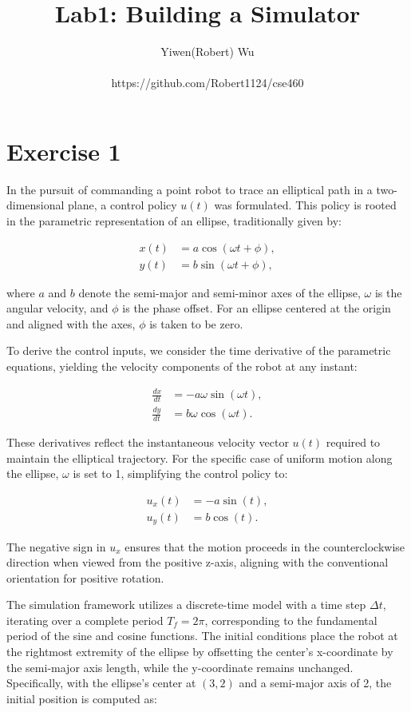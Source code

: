 \documentclass[letterpaper, 10 pt, conference]{ieeeconf}  %
\title{\LARGE \bf
Lab1: Building a Simulator
}
\author{Yiwen(Robert) Wu\\\\https://github.com/Robert1124/cse460}
\begin{document}
\maketitle
\thispagestyle{empty}
\pagestyle{empty}

\section{Exercise 1}

In the pursuit of commanding a point robot to trace an elliptical path in a two-dimensional plane, a control policy \( u(t) \) was formulated. This policy is rooted in the parametric representation of an ellipse, traditionally given by:

\begin{align}
    x(t) &= a \cos(\omega t + \phi), \\
    y(t) &= b \sin(\omega t + \phi),
\end{align}

where \( a \) and \( b \) denote the semi-major and semi-minor axes of the ellipse, \( \omega \) is the angular velocity, and \( \phi \) is the phase offset. For an ellipse centered at the origin and aligned with the axes, \( \phi \) is taken to be zero.

To derive the control inputs, we consider the time derivative of the parametric equations, yielding the velocity components of the robot at any instant:

\begin{align}
    \frac{dx}{dt} &= -a \omega \sin(\omega t), \\
    \frac{dy}{dt} &= b \omega \cos(\omega t).
\end{align}

These derivatives reflect the instantaneous velocity vector \( u(t) \) required to maintain the elliptical trajectory. For the specific case of uniform motion along the ellipse, \( \omega \) is set to 1, simplifying the control policy to:

\begin{align}
    u_x(t) &= -a \sin(t), \\
    u_y(t) &= b \cos(t).
\end{align}

The negative sign in \( u_x \) ensures that the motion proceeds in the counterclockwise direction when viewed from the positive z-axis, aligning with the conventional orientation for positive rotation.

The simulation framework utilizes a discrete-time model with a time step \( \Delta t \), iterating over a complete period \( T_f = 2\pi \), corresponding to the fundamental period of the sine and cosine functions. The initial conditions place the robot at the rightmost extremity of the ellipse by offsetting the center's x-coordinate by the semi-major axis length, while the y-coordinate remains unchanged. Specifically, with the ellipse's center at \( (3, 2) \) and a semi-major axis of 2, the initial position is computed as:
\end{document}
